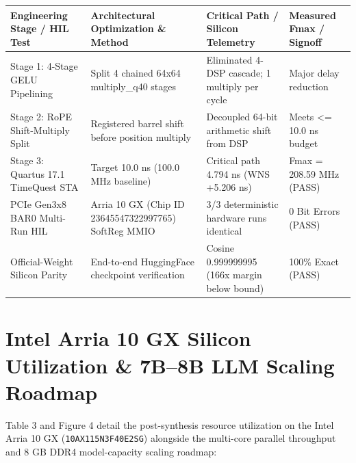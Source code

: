 \documentclass[11pt,a4paper]{article}
\begin{document}
{\footnotesize\renewcommand{\arraystretch}{1.14}\begin{longtable}{@{}L{0.23\textwidth}L{0.27\textwidth}L{0.24\textwidth}L{0.16\textwidth}@{}}\toprule

\textbf{Engineering Stage /\allowbreak{} HIL Test} & \textbf{Architectural Optimization \& Method} & \textbf{Critical Path /\allowbreak{} Silicon Telemetry} & \textbf{Measured Fmax /\allowbreak{} Signoff}\\\midrule\endhead

Stage 1: 4-Stage GELU Pipelining & Split 4 chained 64x64 multiply\_\allowbreak{}q40 stages & Eliminated 4-DSP cascade; 1 multiply per cycle & Major delay reduction\\[2pt]

Stage 2: RoPE Shift-Multiply Split & Registered barrel shift before position multiply & Decoupled 64-bit arithmetic shift from DSP & Meets <=\allowbreak{} 10.0 ns budget\\[2pt]

Stage 3: Quartus 17.1 TimeQuest STA & Target 10.0 ns (\allowbreak{}100.0 MHz baseline)\allowbreak{} & Critical path 4.794 ns (\allowbreak{}WNS +\allowbreak{}5.206 ns)\allowbreak{} & Fmax =\allowbreak{} 208.59 MHz (\allowbreak{}PASS)\allowbreak{}\\[2pt]

PCIe Gen3x8 BAR0 Multi-Run HIL & Arria 10 GX (\allowbreak{}Chip ID 23645547\allowbreak{}32299776\allowbreak{}5)\allowbreak{} SoftReg MMIO & 3/\allowbreak{}3 deterministic hardware runs identical & 0 Bit Errors (\allowbreak{}PASS)\allowbreak{}\\[2pt]

Official-Weight Silicon Parity & End-to-end HuggingFace checkpoint verification & Cosine 0.99999999\allowbreak{}5 (\allowbreak{}166x margin below bound)\allowbreak{} & 100\% Exact (\allowbreak{}PASS)\allowbreak{}\\[2pt]

\bottomrule\end{longtable}}

\section{Intel Arria 10 GX Silicon Utilization \& 7B--8B LLM Scaling Roadmap}

Table 3 and Figure 4 detail the post-synthesis resource utilization on the Intel Arria 10 GX (\texttt{10AX115N3F40E2SG}) alongside the multi-core parallel throughput and 8 GB DDR4 model-capacity scaling roadmap:
\end{document}
